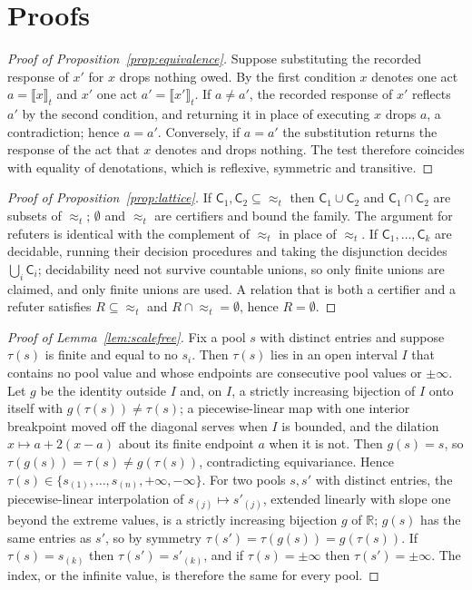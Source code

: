 \section{Proofs}\label{app:proofs}

\begin{proof}[Proof of Proposition~\ref{prop:equivalence}]
Suppose substituting the recorded response of $x'$ for $x$ drops nothing owed. By the first condition $x$ denotes one act $a=\llbracket x\rrbracket_t$ and $x'$ one act $a'=\llbracket x'\rrbracket_t$. If $a\ne a'$, the recorded response of $x'$ reflects $a'$ by the second condition, and returning it in place of executing $x$ drops $a$, a contradiction; hence $a=a'$. Conversely, if $a=a'$ the substitution returns the response of the act that $x$ denotes and drops nothing. The test therefore coincides with equality of denotations, which is reflexive, symmetric and transitive.
\end{proof}

\begin{proof}[Proof of Proposition~\ref{prop:lattice}]
If $\mathsf{C}_1,\mathsf{C}_2\subseteq{\approx_t}$ then $\mathsf{C}_1\cup\mathsf{C}_2$ and $\mathsf{C}_1\cap\mathsf{C}_2$ are subsets of $\approx_t$; $\emptyset$ and $\approx_t$ are certifiers and bound the family. The argument for refuters is identical with the complement of $\approx_t$ in place of $\approx_t$. If $\mathsf{C}_1,\dots,\mathsf{C}_k$ are decidable, running their decision procedures and taking the disjunction decides $\bigcup_i\mathsf{C}_i$; decidability need not survive countable unions, so only finite unions are claimed, and only finite unions are used. A relation that is both a certifier and a refuter satisfies $R\subseteq{\approx_t}$ and $R\cap{\approx_t}=\emptyset$, hence $R=\emptyset$.
\end{proof}

\begin{proof}[Proof of Lemma~\ref{lem:scalefree}]
Fix a pool $s$ with distinct entries and suppose $\tau(s)$ is finite and equal to no $s_i$. Then $\tau(s)$ lies in an open interval $I$ that contains no pool value and whose endpoints are consecutive pool values or $\pm\infty$. Let $g$ be the identity outside $I$ and, on $I$, a strictly increasing bijection of $I$ onto itself with $g(\tau(s))\ne\tau(s)$; a piecewise-linear map with one interior breakpoint moved off the diagonal serves when $I$ is bounded, and the dilation $x\mapsto a+2(x-a)$ about its finite endpoint $a$ when it is not. Then $g(s)=s$, so $\tau(g(s))=\tau(s)\ne g(\tau(s))$, contradicting equivariance. Hence $\tau(s)\in\{s_{(1)},\dots,s_{(n)},+\infty,-\infty\}$. For two pools $s,s'$ with distinct entries, the piecewise-linear interpolation of $s_{(j)}\mapsto s'_{(j)}$, extended linearly with slope one beyond the extreme values, is a strictly increasing bijection $g$ of $\mathbb{R}$; $g(s)$ has the same entries as $s'$, so by symmetry $\tau(s')=\tau(g(s))=g(\tau(s))$. If $\tau(s)=s_{(k)}$ then $\tau(s')=s'_{(k)}$, and if $\tau(s)=\pm\infty$ then $\tau(s')=\pm\infty$. The index, or the infinite value, is therefore the same for every pool.
\end{proof}

